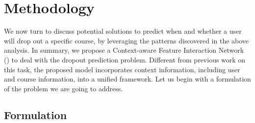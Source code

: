 \section{Methodology}
We now turn to discuss potential solutions to predict when and whether a user will drop out a specific course, 
by leveraging the patterns discovered in the above analysis. In summary, we propose a Context-aware Feature Interaction Network (\modelname{}) to deal with the dropout prediction problem. Different from previous work on this task, the proposed model incorporates context information, including user and course information, into a unified framework. Let us begin with a formulation of the problem we are going to address.

\subsection{Formulation}
	\label{ProblemDef}
	


